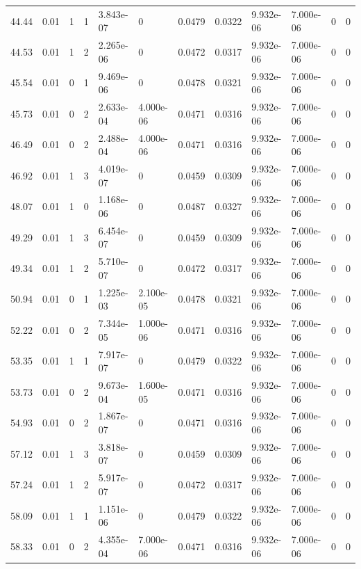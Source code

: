 \documentclass[preview]{standalone}
\begin{document}
{{{\begin{tabular}{L{1.2cm}C{1.2cm} C{0.3cm}C{0.5cm} C{1.4cm}C{1.4cm} C{1.4cm}C{1.4cm} C{1.6cm}C{1.6cm} C{1.6cm}C{1.6cm}}
  44.44  &  0.01  & 1     &  1 &  3.843e-07  & 0  &  0.0479&   0.0322& 9.932e-06 & 7.000e-06   &  0 & 0  \\ 
  44.53  &  0.01  & 1     &  2 &  2.265e-06  & 0  &  0.0472&   0.0317& 9.932e-06 & 7.000e-06   &  0 & 0  \\ 
  45.54  &  0.01  & 0     &  1 &  9.469e-06  & 0  &  0.0478&   0.0321& 9.932e-06 & 7.000e-06   &  0 & 0  \\ 
  45.73  &  0.01  & 0     &  2 &  2.633e-04  & 4.000e-06  &  0.0471&   0.0316& 9.932e-06 & 7.000e-06   &  0 & 0  \\ 
  46.49  &  0.01  & 0     &  2 &  2.488e-04  & 4.000e-06  &  0.0471&   0.0316& 9.932e-06 & 7.000e-06   &  0 & 0  \\ 
  46.92  &  0.01  & 1     &  3 &  4.019e-07  & 0  &  0.0459&   0.0309& 9.932e-06 & 7.000e-06   &  0 & 0  \\ 
  48.07  &  0.01  & 1     &  0 &  1.168e-06  & 0  &  0.0487&   0.0327& 9.932e-06 & 7.000e-06   &  0 & 0  \\ 
  49.29  &  0.01  & 1     &  3 &  6.454e-07  & 0  &  0.0459&   0.0309& 9.932e-06 & 7.000e-06   &  0 & 0  \\ 
  49.34  &  0.01  & 1     &  2 &  5.710e-07  & 0  &  0.0472&   0.0317& 9.932e-06 & 7.000e-06   &  0 & 0  \\ 
  50.94  &  0.01  & 0     &  1 &  1.225e-03  & 2.100e-05  &  0.0478&   0.0321& 9.932e-06 & 7.000e-06   &  0 & 0  \\ 
  52.22  &  0.01  & 0     &  2 &  7.344e-05  & 1.000e-06  &  0.0471&   0.0316& 9.932e-06 & 7.000e-06   &  0 & 0  \\ 
  53.35  &  0.01  & 1     &  1 &  7.917e-07  & 0  &  0.0479&   0.0322& 9.932e-06 & 7.000e-06   &  0 & 0  \\ 
  53.73  &  0.01  & 0     &  2 &  9.673e-04  & 1.600e-05  &  0.0471&   0.0316& 9.932e-06 & 7.000e-06   &  0 & 0  \\ 
  54.93  &  0.01  & 0     &  2 &  1.867e-07  & 0  &  0.0471&   0.0316& 9.932e-06 & 7.000e-06   &  0 & 0  \\ 
  57.12  &  0.01  & 1     &  3 &  3.818e-07  & 0  &  0.0459&   0.0309& 9.932e-06 & 7.000e-06   &  0 & 0  \\ 
  57.24  &  0.01  & 1     &  2 &  5.917e-07  & 0  &  0.0472&   0.0317& 9.932e-06 & 7.000e-06   &  0 & 0  \\ 
  58.09  &  0.01  & 1     &  1 &  1.151e-06  & 0  &  0.0479&   0.0322& 9.932e-06 & 7.000e-06   &  0 & 0  \\ 
  58.33  &  0.01  & 0     &  2 &  4.355e-04  & 7.000e-06  &  0.0471&   0.0316& 9.932e-06 & 7.000e-06   &  0 & 0  \\ 

\end{tabular}}}}
\end{document}

